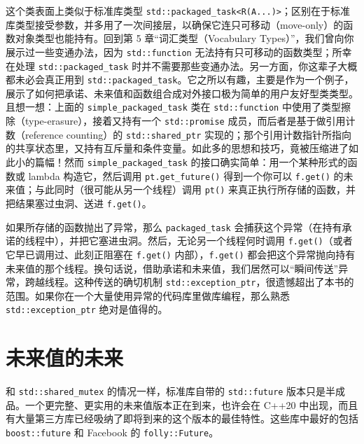 这个类表面上类似于标准库类型 \texttt{std::\allowbreak{}packaged\_\allowbreak{}task<\allowbreak{}R(\allowbreak{}A...)\allowbreak{}>}；区别在于标准库类型接受参数，并多用了一次间接层，以确保它连只可移动（move-only）的函数对象类型也能持有。回到第 5 章“词汇类型（Vocabulary Types）”，我们曾向你展示过一些变通办法，因为 \texttt{std::\allowbreak{}function} 无法持有只可移动的函数类型；所幸在处理 \texttt{std::\allowbreak{}packaged\_\allowbreak{}task} 时并不需要那些变通办法。另一方面，你这辈子大概都未必会真正用到 \texttt{std::\allowbreak{}packaged\_\allowbreak{}task}。它之所以有趣，主要是作为一个例子，展示了如何把承诺、未来值和函数组合成对外接口极为简单的用户友好型类类型。且想一想：上面的 \texttt{simple\_\allowbreak{}packaged\_\allowbreak{}task} 类在 \texttt{std::\allowbreak{}function} 中使用了类型擦除（type-erasure），接着又持有一个 \texttt{std::\allowbreak{}promise} 成员，而后者是基于做引用计数（reference counting）的 \texttt{std::\allowbreak{}shared\_\allowbreak{}ptr} 实现的；那个引用计数指针所指向的共享状态里，又持有互斥量和条件变量。如此多的思想和技巧，竟被压缩进了如此小的篇幅！然而 \texttt{simple\_\allowbreak{}packaged\_\allowbreak{}task} 的接口确实简单：用一个某种形式的函数或 lambda 构造它，然后调用 \texttt{pt.\allowbreak{}get\_\allowbreak{}future(\allowbreak{})\allowbreak{}} 得到一个你可以 \texttt{f.\allowbreak{}get(\allowbreak{})\allowbreak{}} 的未来值；与此同时（很可能从另一个线程）调用 \texttt{pt(\allowbreak{})\allowbreak{}} 来真正执行所存储的函数，并把结果塞过虫洞、送进 \texttt{f.\allowbreak{}get(\allowbreak{})\allowbreak{}}。

如果所存储的函数抛出了异常，那么 \texttt{packaged\_\allowbreak{}task} 会捕获这个异常（在持有承诺的线程中），并把它塞进虫洞。然后，无论另一个线程何时调用 \texttt{f.\allowbreak{}get(\allowbreak{})\allowbreak{}}（或者它早已调用过、此刻正阻塞在 \texttt{f.\allowbreak{}get(\allowbreak{})\allowbreak{}} 内部），\texttt{f.\allowbreak{}get(\allowbreak{})\allowbreak{}} 都会把这个异常抛向持有未来值的那个线程。换句话说，借助承诺和未来值，我们居然可以“瞬间传送”异常，跨越线程。这种传送的确切机制 \texttt{std::\allowbreak{}exception\_\allowbreak{}ptr}，很遗憾超出了本书的范围。如果你在一个大量使用异常的代码库里做库编程，那么熟悉 \texttt{std::\allowbreak{}exception\_\allowbreak{}ptr} 绝对是值得的。

\section{未来值的未来}

和 \texttt{std::\allowbreak{}shared\_\allowbreak{}mutex} 的情况一样，标准库自带的 \texttt{std::\allowbreak{}future} 版本只是半成品。一个更完整、更实用的未来值版本正在到来，也许会在 C++20 中出现，而且有大量第三方库已经吸纳了即将到来的这个版本的最佳特性。这些库中最好的包括 \texttt{boost::\allowbreak{}future} 和 Facebook 的 \texttt{folly::\allowbreak{}Future}。

